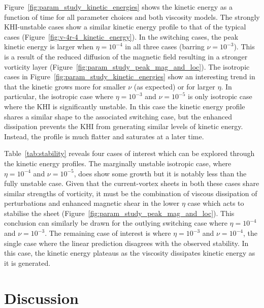 

Figure~\ref{fig:param_study_kinetic_energies} shows the kinetic energy as a function of time for all parameter choices and both viscosity models. The strongly KHI-unstable cases show a similar kinetic energy profile to that of the typical cases (Figure~\ref{fig:v-4r-4_kinetic_energy}). In the switching cases, the peak kinetic energy is larger when $\eta=10^{-4}$ in all three cases (barring $\nu = 10^{-3}$). This is a result of the reduced diffusion of the magnetic field resulting in a stronger vorticity layer (Figure~\ref{fig:param_study_peak_mag_and_loc}). The isotropic cases in Figure~\ref{fig:param_study_kinetic_energies} show an interesting trend in that the kinetic grows more for smaller $\nu$ (as expected) or for larger $\eta$. In particular, the isotropic case where $\eta=10^{-3}$ and $\nu=10^{-5}$ is only isotropic case where the KHI is significantly unstable. In this case the kinetic energy profile shares a similar shape to the associated switching case, but the enhanced dissipation prevents the KHI from generating similar levels of kinetic energy. Instead, the profile is much flatter and saturates at a later time.

Table~\ref{tab:stability} reveals four cases of interest which can be explored through the kinetic energy profiles. The marginally unstable isotropic case, where $\eta=10^{-4}$ and $\nu=10^{-5}$, does show some growth but it is notably less than the fully unstable case. Given that the current-vortex sheets in both these cases share similar strengths of vorticity, it must be the combination of viscous dissipation of perturbations and enhanced magnetic shear in the lower $\eta$ case which acts to stabilise the sheet (Figure~\ref{fig:param_study_peak_mag_and_loc}). This conclusion can similarly be drawn for the outlying switching case where $\eta=10^{-4}$ and $\nu=10^{-3}$. The remaining case of interest is where $\eta=10^{-3}$ and $\nu=10^{-4}$, the single case where the linear prediction disagrees with the observed stability. In this case, the kinetic energy plateaus as the viscosity dissipates kinetic energy as it is generated.



\section{Discussion}
\label{sec:khi_discussion}

